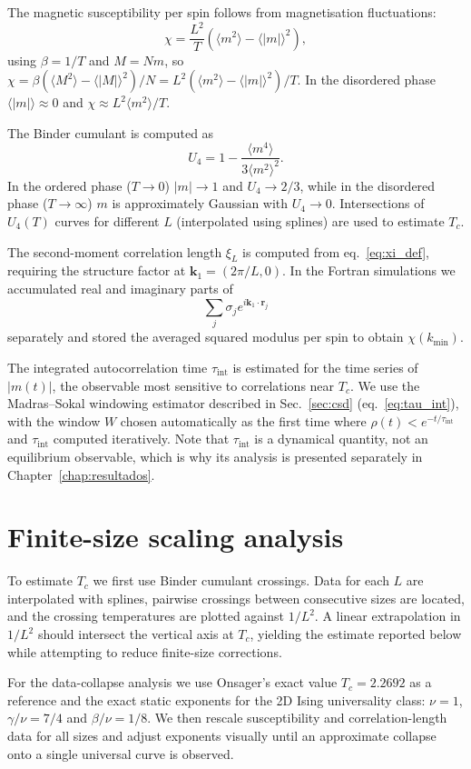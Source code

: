 The magnetic susceptibility per spin follows from magnetisation fluctuations:
\[ \chi=\frac{L^2}{T}\left(\langle m^2\rangle-\langle|m|\rangle^2\right), \]
using $\beta=1/T$ and $M=Nm$, so $\chi=\beta(\langle M^2\rangle-\langle|M|\rangle^2)/N=L^2(\langle m^2\rangle-\langle|m|\rangle^2)/T$. In the disordered phase $\langle|m|\rangle\approx0$ and $\chi\approx L^2\langle m^2\rangle/T$.

The Binder cumulant is computed as
\[ U_4=1-\frac{\langle m^4\rangle}{3\langle m^2\rangle^2}. \]
In the ordered phase ($T\to0$) $|m|\to1$ and $U_4\to2/3$, while in the disordered phase ($T\to\infty$) $m$ is approximately Gaussian with $U_4\to0$. Intersections of $U_4(T)$ curves for different $L$ (interpolated using splines) are used to estimate $T_c$.

The second-moment correlation length $\xi_L$ is computed from eq.~\eqref{eq:xi_def}, requiring the structure factor at $\mathbf{k}_1=(2\pi/L,0)$. In the Fortran simulations we accumulated real and imaginary parts of
\[ \sum_j\sigma_j e^{i\mathbf{k}_1\cdot\mathbf{r}_j} \]
separately and stored the averaged squared modulus per spin to obtain $\chi(k_{\min})$.

The integrated autocorrelation time $\tau_{\mathrm{int}}$ is estimated for the time series of $|m(t)|$, the observable most sensitive to correlations near $T_c$. We use the Madras–Sokal windowing estimator described in Sec.~\ref{sec:csd} (eq.~\eqref{eq:tau_int}), with the window $W$ chosen automatically as the first time where $\rho(t)<e^{-t/\tau_{\mathrm{int}}}$ and $\tau_{\mathrm{int}}$ computed iteratively. Note that $\tau_{\mathrm{int}}$ is a dynamical quantity, not an equilibrium observable, which is why its analysis is presented separately in Chapter~\ref{chap:resultados}.

\section{Finite-size scaling analysis}

To estimate $T_c$ we first use Binder cumulant crossings. Data for each $L$ are interpolated with splines, pairwise crossings between consecutive sizes are located, and the crossing temperatures are plotted against $1/L^2$. A linear extrapolation in $1/L^2$ should intersect the vertical axis at $T_c$, yielding the estimate reported below while attempting to reduce finite-size corrections.

For the data-collapse analysis we use Onsager's exact value $T_c=2.2692$ as a reference and the exact static exponents for the 2D Ising universality class: $\nu=1$, $\gamma/\nu=7/4$ and $\beta/\nu=1/8$. We then rescale susceptibility and correlation-length data for all sizes and adjust exponents visually until an approximate collapse onto a single universal curve is observed.

